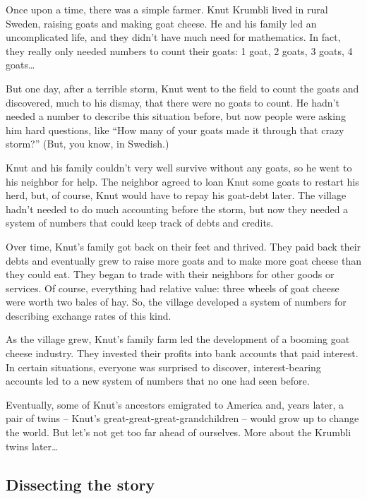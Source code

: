 \begin{story}
Once upon a time, there was a simple farmer. Knut Krumbli lived in rural Sweden, raising goats and making goat cheese. He and his family led an uncomplicated life, and they didn't have much need for mathematics. In fact, they really only needed numbers to count their goats: 1 goat, 2 goats, 3 goats, 4 goats\ldots

But one day, after a terrible storm, Knut went to the field to count the goats and discovered, much to his dismay, that there were no goats to count. He hadn't needed a number to describe this situation before, but now people were asking him hard questions, like ``How many of your goats made it through that crazy storm?'' (But, you know, in Swedish.)

Knut and his family couldn't very well survive without any goats, so he went to his neighbor for help. The neighbor agreed to loan Knut some goats to restart his herd, but, of course, Knut would have to repay his goat-debt later. The village hadn't needed to do much accounting before the storm, but now they needed a system of numbers that could keep track of debts and credits.

Over time, Knut's family got back on their feet and thrived. They paid back their debts and eventually grew to raise more goats and to make more goat cheese than they could eat. They began to trade with their neighbors for other goods or services. Of course, everything had relative value: three wheels of goat cheese were worth two bales of hay. So, the village developed a system of numbers for describing exchange rates of this kind.

As the village grew, Knut's family farm led the development of a booming goat cheese industry. They invested their profits into bank accounts that paid interest. In certain situations, everyone was surprised to discover, interest-bearing accounts led to a new system of numbers that no one had seen before.

Eventually, some of Knut's ancestors emigrated to America and, years later, a pair of twins -- Knut's great-great-great-grandchildren -- would grow up to change the world. But let's not get too far ahead of ourselves. More about the Krumbli twins later\ldots
\end{story}


\subsection{Dissecting the story}

